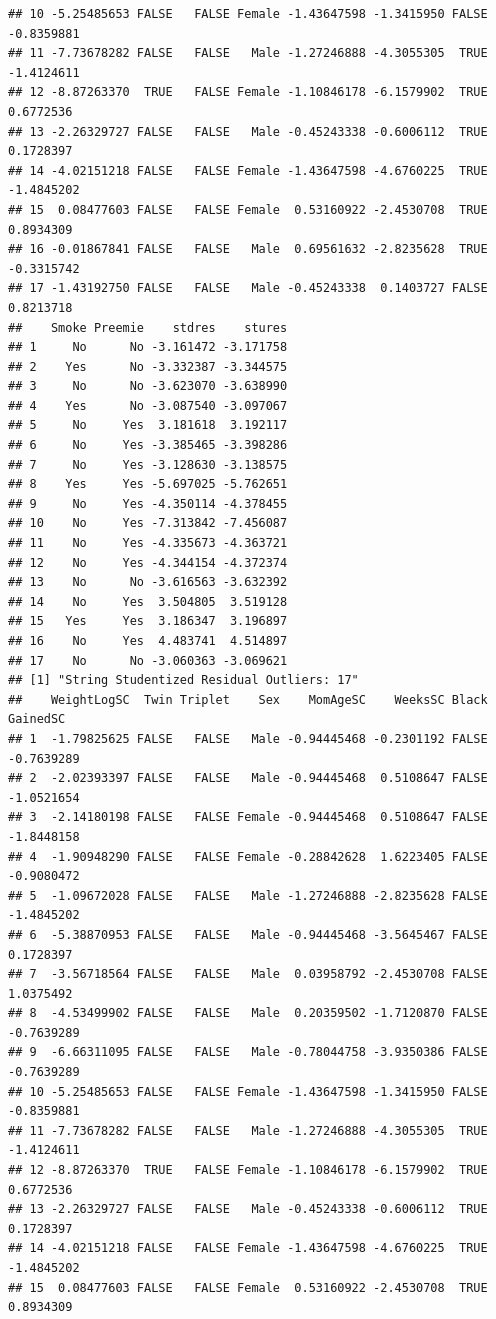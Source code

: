 \documentclass{article}\usepackage[]{graphicx}\usepackage[]{xcolor}
\makeatletter
\newenvironment{kframe}{%
 \def\at@end@of@kframe{}%
 \ifinner\ifhmode%
  \def\at@end@of@kframe{\end{minipage}}%
  \begin{minipage}{\columnwidth}%
 \fi\fi%
 \def\FrameCommand##1{\hskip\@totalleftmargin \hskip-\fboxsep
 \colorbox{shadecolor}{##1}\hskip-\fboxsep
     \hskip-\linewidth \hskip-\@totalleftmargin \hskip\columnwidth}%
 \MakeFramed {\advance\hsize-\width
   \@totalleftmargin\z@ \linewidth\hsize
   \@setminipage}}%
 {\par\unskip\endMakeFramed%
 \at@end@of@kframe}
\newenvironment{knitrout}{}{} %
\makeatother
\begin{document}
\begin{enumerate}[a.]
\begin{knitrout}
\begin{kframe}
\begin{verbatim}
## 10 -5.25485653 FALSE   FALSE Female -1.43647598 -1.3415950 FALSE -0.8359881
## 11 -7.73678282 FALSE   FALSE   Male -1.27246888 -4.3055305  TRUE -1.4124611
## 12 -8.87263370  TRUE   FALSE Female -1.10846178 -6.1579902  TRUE  0.6772536
## 13 -2.26329727 FALSE   FALSE   Male -0.45243338 -0.6006112  TRUE  0.1728397
## 14 -4.02151218 FALSE   FALSE Female -1.43647598 -4.6760225  TRUE -1.4845202
## 15  0.08477603 FALSE   FALSE Female  0.53160922 -2.4530708  TRUE  0.8934309
## 16 -0.01867841 FALSE   FALSE   Male  0.69561632 -2.8235628  TRUE -0.3315742
## 17 -1.43192750 FALSE   FALSE   Male -0.45243338  0.1403727 FALSE  0.8213718
##    Smoke Preemie    stdres    stures
## 1     No      No -3.161472 -3.171758
## 2    Yes      No -3.332387 -3.344575
## 3     No      No -3.623070 -3.638990
## 4    Yes      No -3.087540 -3.097067
## 5     No     Yes  3.181618  3.192117
## 6     No     Yes -3.385465 -3.398286
## 7     No     Yes -3.128630 -3.138575
## 8    Yes     Yes -5.697025 -5.762651
## 9     No     Yes -4.350114 -4.378455
## 10    No     Yes -7.313842 -7.456087
## 11    No     Yes -4.335673 -4.363721
## 12    No     Yes -4.344154 -4.372374
## 13    No      No -3.616563 -3.632392
## 14    No     Yes  3.504805  3.519128
## 15   Yes     Yes  3.186347  3.196897
## 16    No     Yes  4.483741  4.514897
## 17    No      No -3.060363 -3.069621
## [1] "String Studentized Residual Outliers: 17"
##    WeightLogSC  Twin Triplet    Sex    MomAgeSC    WeeksSC Black   GainedSC
## 1  -1.79825625 FALSE   FALSE   Male -0.94445468 -0.2301192 FALSE -0.7639289
## 2  -2.02393397 FALSE   FALSE   Male -0.94445468  0.5108647 FALSE -1.0521654
## 3  -2.14180198 FALSE   FALSE Female -0.94445468  0.5108647 FALSE -1.8448158
## 4  -1.90948290 FALSE   FALSE Female -0.28842628  1.6223405 FALSE -0.9080472
## 5  -1.09672028 FALSE   FALSE   Male -1.27246888 -2.8235628 FALSE -1.4845202
## 6  -5.38870953 FALSE   FALSE   Male -0.94445468 -3.5645467 FALSE  0.1728397
## 7  -3.56718564 FALSE   FALSE   Male  0.03958792 -2.4530708 FALSE  1.0375492
## 8  -4.53499902 FALSE   FALSE   Male  0.20359502 -1.7120870 FALSE -0.7639289
## 9  -6.66311095 FALSE   FALSE   Male -0.78044758 -3.9350386 FALSE -0.7639289
## 10 -5.25485653 FALSE   FALSE Female -1.43647598 -1.3415950 FALSE -0.8359881
## 11 -7.73678282 FALSE   FALSE   Male -1.27246888 -4.3055305  TRUE -1.4124611
## 12 -8.87263370  TRUE   FALSE Female -1.10846178 -6.1579902  TRUE  0.6772536
## 13 -2.26329727 FALSE   FALSE   Male -0.45243338 -0.6006112  TRUE  0.1728397
## 14 -4.02151218 FALSE   FALSE Female -1.43647598 -4.6760225  TRUE -1.4845202
## 15  0.08477603 FALSE   FALSE Female  0.53160922 -2.4530708  TRUE  0.8934309

\end{verbatim}
\end{kframe}
\end{knitrout}
\end{enumerate}
\end{document}

